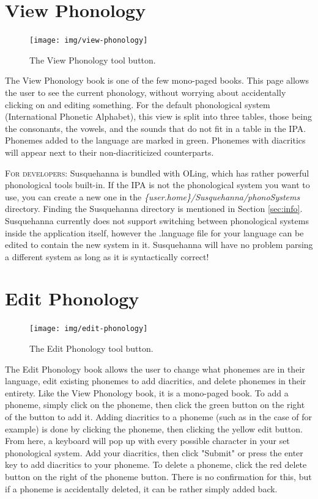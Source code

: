 \documentclass{report}
\begin{document}
	\section{View Phonology}
	\begin{figure}
		\centering
		\texttt{[image: img/view-phonology]}
		\caption{The View Phonology tool button.}
		\label{fig:view-phonology}
	\end{figure}
	The View Phonology book is one of the few mono-paged books. This page allows the user to see the current phonology, without worrying about accidentally clicking on and editing something. For the default phonological system (International Phonetic Alphabet), this view is split into three tables, those being the consonants, the vowels, and the sounds that do not fit in a table in the IPA. Phonemes added to the language are marked in green. Phonemes with diacritics will appear next to their non-diacriticized counterparts.
	\begin{tcolorbox}[width=1\textwidth]
		\textsc{For developers:} Susquehanna is bundled with OLing, which has rather powerful phonological tools built-in. If the IPA is not the phonological system you want to use, you can create a new one in the \emph{\{user.home\}/Susquehanna/phonoSystems} directory. Finding the Susquehanna directory is mentioned in Section \ref{sec:info}. Susquehanna currently does not support switching between phonological systems inside the application itself, however the .language file for your language can be edited to contain the new system in it. Susquehanna will have no problem parsing a different system as long as it is syntactically correct!
	\end{tcolorbox}
	\section{Edit Phonology}
	\begin{figure}
		\centering
		\texttt{[image: img/edit-phonology]}
		\caption{The Edit Phonology tool button.}
		\label{fig:edit-phonology}
	\end{figure}
	The Edit Phonology book allows the user to change what phonemes are in their language, edit existing phonemes to add diacritics, and delete phonemes in their entirety. Like the View Phonology book, it is a mono-paged book. To add a phoneme, simply click on the phoneme, then click the green button on the right of the button to add it. Adding diacritics to a phoneme (such as in the case of  for example) is done by clicking the phoneme, then clicking the yellow edit button. From here, a keyboard will pop up with every possible character in your set phonological system. Add your diacritics, then click "Submit" or press the enter key to add diacritics to your phoneme. To delete a phoneme, click the red delete button on the right of the phoneme button. There is no confirmation for this, but if a phoneme is accidentally deleted, it can be rather simply added back.
\end{document}
